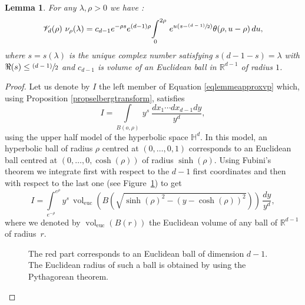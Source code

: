 \documentclass[JEP,XML,SOM,Unicode,NoFloatCountersInSection,published]{cedram}
\let\mathcal\mathscr
\newcommand{\psfrac}[2]{\sfrac{(#1)}{#2}}
\theoremstyle{plain}
\newtheorem{lemma}[equation]{Lemma}
\theoremstyle{definition}
\newcommand{\HH}{\mathbb{H}}
\newcommand{\RR}{\mathbb{R}}
\newcommand{\inte}[1]{\underset{#1}{\int}}
\DeclareMathOperator{\vol}{vol}
\begin{document}
\begin{lemma}
\label{lemmaselbergstoformula}
For any $\lambda, \rho > 0$ we have :
\begin{equation}
\label{eqlemmeapproxvp} \mathcal{V}_d(\rho) \ \nu_{\rho}(\lambda) = c_{d-1} e^{-\rho s} e^{(d-1)\rho} \inte{0}^{2\rho} \ e^{u \left(s - \psfrac{d-1}{2} \right)} \theta(\rho, u-\rho) \,du,
\end{equation}
where $s = s(\lambda)$ is the unique complex number satisfying $s(d-1-s) = \lambda$ with $\Re(s) \le \psfrac{d-1}{2}$ and $c_{d-1}$ is volume of an Euclidean ball in $\RR^{d-1}$ of radius $1$.
\end{lemma}

\begin{proof}
Let us denote by $I$ the left member of Equation \eqref{eqlemmeapproxvp} which, using Proposition \ref{propselbergtransform}, satisfies
\begin{equation}
\label{eqfig1}
I = \inte{B(o,\rho)} \ y^s \ \frac{dx_1\cdots dx_{d-1}dy}{y^d},
\end{equation}
using the upper half model of the hyperbolic space $\HH^d$. In this model, an hyperbolic ball of radius $\rho$ centred at $(0,\dots,0,1)$ corresponds to an Euclidean ball centred at $(0,\dots,0,\cosh(\rho))$ of radius $\sinh(\rho)$. Using Fubini's theorem we integrate first with respect to the $d-1$ first coordinates and then with respect to the last one (see Figure~\ref{figure dessin1}) to get
\[
I = \inte{e^{-\rho}}^{e^{\rho}} y^s \, \vol_{\mathrm{euc}} \left(B \left(\sqrt{ \sinh(\rho)^2 - (y - \cosh(\rho))^2} \right) \right) \, \frac{dy}{y^d},
\]
where we denoted by $\vol_{\text{euc}}(B(r))$ the Euclidean volume of any ball of $\RR^{d-1}$ of radius~$r$.

\begin{figure}[htb]
\begin{center}
\def\svgwidth{0.6 \columnwidth}

\caption{The red part corresponds to an Euclidean ball of dimension $d-1$. The Euclidean radius of such a ball is obtained by using the Pythagorean theorem.}
\label{figure dessin1}
\vspace*{-\baselineskip}%
\end{center}
\end{figure}


\end{proof}
\end{document}
